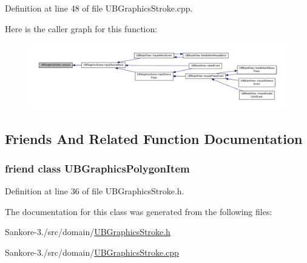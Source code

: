 Definition at line 48 of file U\-B\-Graphics\-Stroke.\-cpp.



Here is the caller graph for this function\-:
\nopagebreak
\begin{figure}[H]
\begin{center}
\leavevmode
\includegraphics[width=350pt]{de/d75/class_u_b_graphics_stroke_aeecdbfc012ba82636e96ffe0d9d13846_icgraph}
\end{center}
\end{figure}




\subsection{Friends And Related Function Documentation}
\hypertarget{class_u_b_graphics_stroke_aec6ebbda09c500f9f324b3881394977b}{
\subsubsection[{U\-B\-Graphics\-Polygon\-Item}]{\setlength{\rightskip}{0pt plus 5cm}friend class {\bf U\-B\-Graphics\-Polygon\-Item}\hspace{0.3cm}{\ttfamily [friend]}}}\label{de/d75/class_u_b_graphics_stroke_aec6ebbda09c500f9f324b3881394977b}


Definition at line 36 of file U\-B\-Graphics\-Stroke.\-h.



The documentation for this class was generated from the following files\-:\begin{DoxyCompactItemize}
\item 
Sankore-\/3./src/domain/\hyperlink{_u_b_graphics_stroke_8h}{U\-B\-Graphics\-Stroke.\-h}\item 
Sankore-\/3./src/domain/\hyperlink{_u_b_graphics_stroke_8cpp}{U\-B\-Graphics\-Stroke.\-cpp}\end{DoxyCompactItemize}
